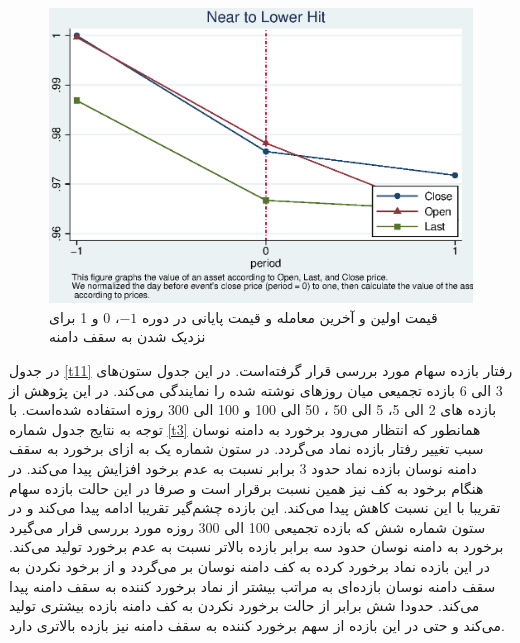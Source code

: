 \documentclass[12pt]{article}
\begin{document}
      \begin{figure}[htbp]
      \centering
      \includegraphics[width=0.8\columnwidth]{DCLT.eps}
     \caption{ قیمت اولین  و آخرین معامله و قیمت پایانی در دوره 
     $ -1 $،
     0 
     و 
     1 
     برای نزدیک شدن به سقف دامنه}
      \label{g30}
      \end{figure}

  
 
    
    

  
  \FloatBarrier
  
  در جدول 
  \ref{t11}
 رفتار بازده سهام مورد بررسی قرار گرفته‌است. در این جدول  
   ستون‌های 3 الی 6   بازده تجمیعی میان روز‌های نوشته شده را نمایندگی می‌کند. در این پژوهش از بازده های 2 الی 5، 5 الی 50 ، 50 الی 100 و 100 الی 300 روزه استفاده شده‌است. با توجه به نتایج جدول شماره 
   \ref{t3}
   همانطور که انتظار می‌رود برخورد به دامنه نوسان سبب تغییر رفتار بازده نماد می‌گردد. در ستون شماره یک به ازای برخورد به سقف دامنه نوسان بازده نماد حدود 3 برابر نسبت به عدم برخود افزایش پیدا می‌کند. در هنگام برخود به کف نیز همین نسبت برقرار است و صرفا در این حالت بازده سهام تقریبا با این نسبت کاهش پیدا می‌کند. این بازده چشم‌گیر تقریبا ادامه پیدا می‌کند و در ستون شماره شش که بازده تجمیعی 100 الی 300 روزه مورد بررسی قرار می‌گیرد برخورد به دامنه نوسان حدود سه برابر بازده بالا‌تر نسبت به عدم برخورد تولید می‌کند. در این بازده نماد برخورد کرده به کف دامنه نوسان بر می‌گردد و از برخود نکردن به سقف دامنه نوسان بازده‌ای به مراتب بیشتر از نماد برخورد کننده به سقف دامنه پیدا می‌کند. حدودا شش برابر از حالت برخورد نکردن به کف دامنه بازده بیشتری تولید می‌کند و حتی در این بازده از سهم برخورد کننده به سقف دامنه نیز بازده بالاتری دارد.
  
  
  
  
  
  
  
\end{document}

